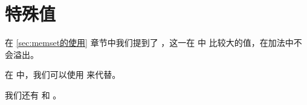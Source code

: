 \section{特殊值}
在 \ref{sec:memset的使用} 章节中我们提到了 ，这一在  中
比较大的值，在加法中不会溢出。

在  中，我们可以使用  来代替。

我们还有  和 。

